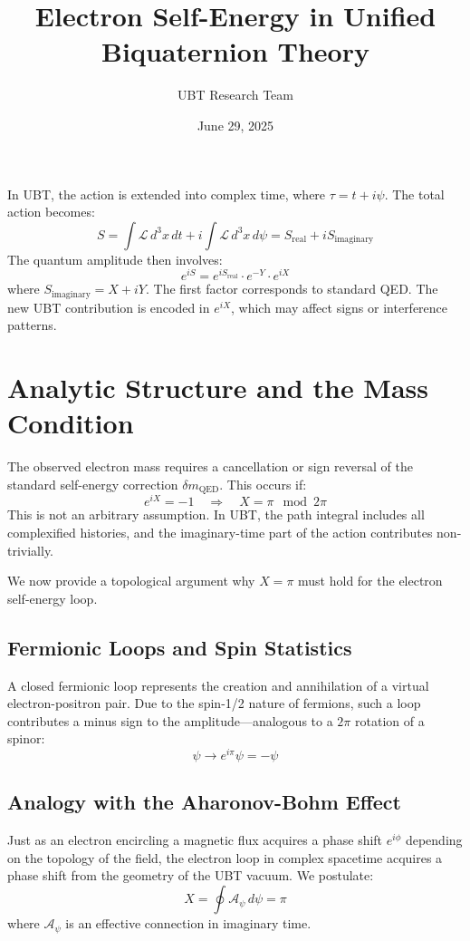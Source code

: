 \documentclass[12pt,a4paper]{article}
\numberwithin{equation}{section}
\theoremstyle{definition}
\theoremstyle{remark}
\begin{document}
\geometry{a4paper, margin=1in}

\title{\textbf{Electron Self-Energy in Unified Biquaternion Theory}}
\author{UBT Research Team}
\date{June 29, 2025}

In UBT, the action is extended into complex time, where \( \tau = t + i\psi \). The total action becomes:
\[
S = \int \mathcal{L} \, d^3x\,dt + i \int \mathcal{L} \, d^3x\,d\psi = S_{\text{real}} + i S_{\text{imaginary}}
\]
The quantum amplitude then involves:
\[
e^{iS} = e^{iS_{\text{real}}} \cdot e^{-Y} \cdot e^{iX}
\]
where \( S_{\text{imaginary}} = X + iY \). The first factor corresponds to standard QED. The new UBT contribution is encoded in \( e^{iX} \), which may affect signs or interference patterns.

\section{Analytic Structure and the Mass Condition}

The observed electron mass requires a cancellation or sign reversal of the standard self-energy correction \( \delta m_{\text{QED}} \). This occurs if:
\[
e^{iX} = -1 \quad \Rightarrow \quad X = \pi \mod 2\pi
\]
This is not an arbitrary assumption. In UBT, the path integral includes all complexified histories, and the imaginary-time part of the action contributes non-trivially.

We now provide a topological argument why \( X = \pi \) must hold for the electron self-energy loop.

\subsection{Fermionic Loops and Spin Statistics}

A closed fermionic loop represents the creation and annihilation of a virtual electron-positron pair. Due to the spin-1/2 nature of fermions, such a loop contributes a minus sign to the amplitude—analogous to a \( 2\pi \) rotation of a spinor:
\[
\psi \rightarrow e^{i\pi} \psi = -\psi
\]

\subsection{Analogy with the Aharonov-Bohm Effect}

Just as an electron encircling a magnetic flux acquires a phase shift \( e^{i\phi} \) depending on the topology of the field, the electron loop in complex spacetime acquires a phase shift from the geometry of the UBT vacuum. We postulate:
\[
X = \oint \mathcal{A}_{\psi} \, d\psi = \pi
\]
where \( \mathcal{A}_{\psi} \) is an effective connection in imaginary time.
\end{document}
